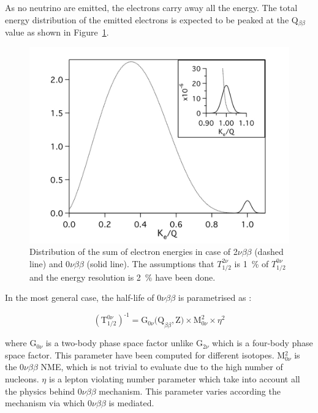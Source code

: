 \documentclass[main.tex]{subfiles}
\begin{document}
\bigskip


\NI As no neutrino are emitted, the electrons carry away all the energy. The total energy distribution of the emitted electrons is expected to be peaked at the Q$_{\beta\beta}$ value as shown in Figure~\ref{bbDecaySpectrum}.


\begin{figure}[h!]
\begin{center}
\includegraphics[scale=0.65]{pictures/Chap2/bbspectra.jpg}
\caption{Distribution of the sum of electron energies in case of 2$\nu\beta\beta$ (dashed line) and 0$\nu\beta\beta$ (solid line). The assumptions that $T_{\text{1/2}}^{\text{2}\nu}$ is 1~\% of $T_{\text{1/2}}^{\text{0}\nu}$ and the energy resolution is 2~\% have been done.}
\label{bbDecaySpectrum}
\end{center}
\end{figure}


\NI In the most general case, the half-life of 0$\nu\beta\beta$ is parametrised as : 


\begin{equation}
(\text{T}_{\text{1/2}}^{\text{0}\nu})^{\text{-1}} = \text{G}_{\text{0}\nu}\text{(Q}_{\beta\beta},\text{Z)} \times \text{M}^\text{2}_{\text{0}\nu} \times \eta^\text{2}
\end{equation}


\bigskip


\NI where G$_{\text{0}\nu}$ is a two-body phase space factor unlike G$_{\text{2}\nu}$ which is a four-body phase space factor. This parameter have been computed for different isotopes. M$^\text{2}_{\text{0}\nu}$ is the 0$\nu\beta\beta$ NME, which is not trivial to evaluate due to the high number of nucleons. $\eta$ is a lepton violating number parameter which take into account all the physics behind 0$\nu\beta\beta$ mechanism. This parameter varies according the mechanism via which 0$\nu\beta\beta$ is mediated.  
\end{document}
